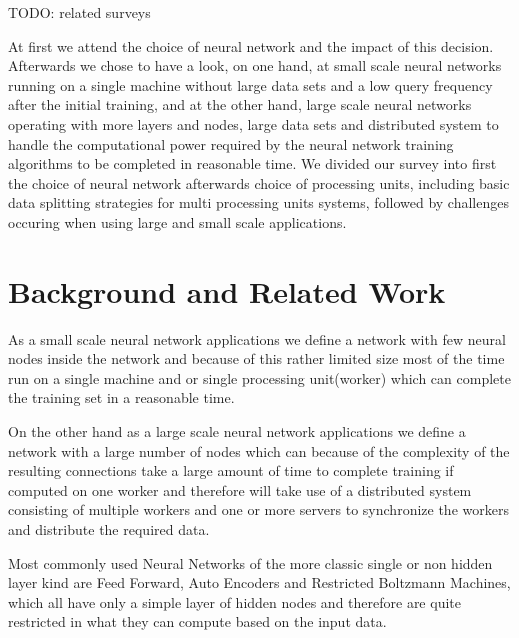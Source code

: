 \documentclass[conference]{IEEEtran}
\begin{document}
TODO: related surveys

 At first we attend the choice of neural network and the impact of this decision. Afterwards we chose to have a look, on one hand, at small scale neural networks running on a single machine without large data sets and a low query frequency after the initial training, and at the other hand, large scale neural networks operating with more layers and nodes, large data sets and distributed system to handle the computational power required by the neural network training algorithms to be completed in reasonable time. We divided our survey into first the choice of neural network afterwards choice of processing units, including basic data splitting strategies for multi processing units systems, followed by challenges occuring when using large and small scale applications.



\section{Background and Related Work}


As a small scale neural network applications we define a network with few neural nodes inside the network and because of this rather limited size most of the time run on a single machine and or single processing unit(worker) which can complete the training set in a reasonable time.



On the other hand as a large scale neural network applications we define a network with a large number of nodes which can because of the complexity of the resulting connections take a large amount of time to complete training if computed on one worker and therefore will take use of a distributed system consisting of multiple workers and one or more servers to synchronize the workers and distribute the required data.



Most commonly used Neural Networks of the more classic single or non hidden layer kind are Feed Forward, Auto Encoders and Restricted Boltzmann Machines, which all have only a simple layer of hidden nodes and therefore are quite restricted in what they can compute based on the input data. 
\end{document}
